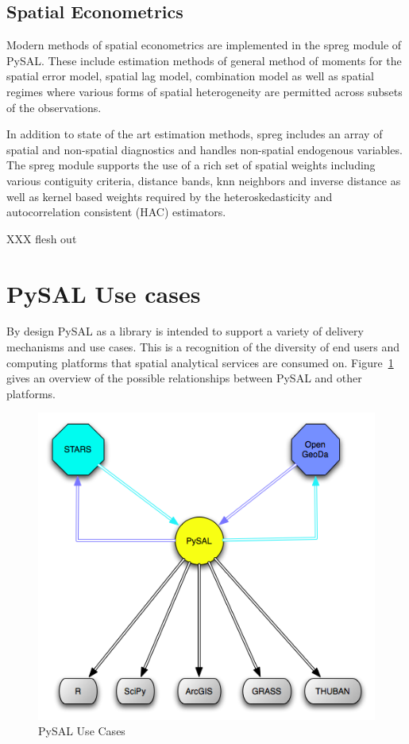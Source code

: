 \documentclass[11pt, titlepage]{article}
\begin{document}
\subsection{Spatial Econometrics}

Modern methods of spatial econometrics are implemented in the spreg
module of PySAL. These include estimation methods of general method of
moments for the spatial error model, spatial lag model, combination
model as well as spatial regimes where various forms of spatial
heterogeneity are permitted across subsets of the observations.

In addition to state of the art estimation methods, spreg includes an
array of spatial and non-spatial diagnostics and handles non-spatial
endogenous variables. The spreg module supports the use of a rich set of
spatial weights including various contiguity criteria, distance bands,
knn neighbors and inverse distance as well as kernel based weights
required by the heteroskedasticity and autocorrelation consistent (HAC)
estimators.

XXX flesh out

\section{PySAL Use cases}

By design PySAL as a library is intended to support a variety of
delivery mechanisms and use cases. This is a recognition of the
diversity of end users and computing platforms that spatial analytical
services are consumed on. Figure~\ref{f:use} gives an overview of the
possible relationships between PySAL and other platforms.

\begin{figure}[ht]
\begin{center}
\includegraphics[width=\linewidth]{pysal_applications.png}
\end{center}
\caption{PySAL Use Cases}
\label{f:use}
\end{figure}   
\end{document}
